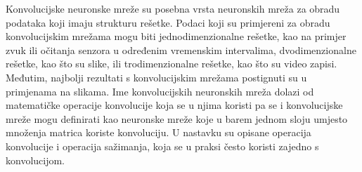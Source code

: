 \nocite{Goodfellow-et-al-2016}

Konvolucijske neuronske mreže su posebna vrsta neuronskih mreža za obradu podataka koji imaju strukturu rešetke. Podaci koji su primjereni za obradu konvolucijskim mrežama mogu biti jednodimenzionalne rešetke, kao na primjer zvuk ili očitanja senzora u određenim vremenskim intervalima, dvodimenzionalne rešetke, kao što su slike, ili trodimenzionalne rešetke, kao što su video zapisi. Međutim, najbolji rezultati s konvolucijskim mrežama postignuti su u primjenama na slikama.
Ime konvolucijskih neuronskih mreža dolazi od matematičke operacije konvolucije koja se u njima koristi pa se i konvolucijske mreže mogu definirati kao neuronske mreže koje u barem jednom sloju umjesto množenja matrica koriste konvoluciju. U nastavku su opisane operacija konvolucije i operacija sažimanja, koja se u praksi često koristi zajedno s konvolucijom.

